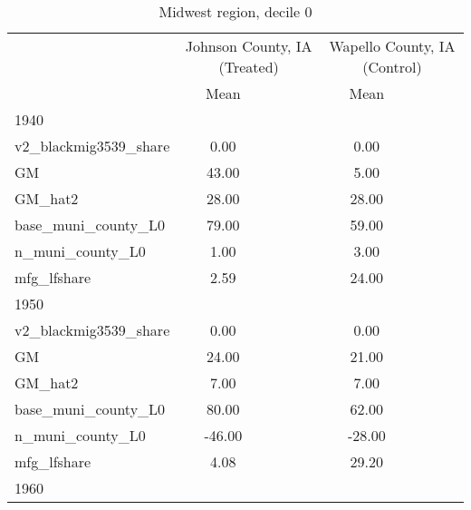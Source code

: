 \begin{table}[htbp]\centering
\def\sym#1{\ifmmode^{#1}\else\(^{#1}\)\fi}
\caption{Midwest region, decile 0 \label{tab1}}
\begin{tabular}{l*{2}{ccc}}
\toprule
                    &\multicolumn{3}{c}{Johnson County, IA (Treated)}&\multicolumn{3}{c}{Wapello County, IA (Control)}\\
                    &        Mean&            &            &        Mean&            &            \\
\midrule
1940                &            &            &            &            &            &            \\
v2\_blackmig3539\_share&        0.00&            &            &        0.00&            &            \\
GM                  &       43.00&            &            &        5.00&            &            \\
GM\_hat2             &       28.00&            &            &       28.00&            &            \\
base\_muni\_county\_L0 &       79.00&            &            &       59.00&            &            \\
n\_muni\_county\_L0    &        1.00&            &            &        3.00&            &            \\
mfg\_lfshare         &        2.59&            &            &       24.00&            &            \\
\midrule
1950                &            &            &            &            &            &            \\
v2\_blackmig3539\_share&        0.00&            &            &        0.00&            &            \\
GM                  &       24.00&            &            &       21.00&            &            \\
GM\_hat2             &        7.00&            &            &        7.00&            &            \\
base\_muni\_county\_L0 &       80.00&            &            &       62.00&            &            \\
n\_muni\_county\_L0    &      -46.00&            &            &      -28.00&            &            \\
mfg\_lfshare         &        4.08&            &            &       29.20&            &            \\
\midrule
1960                &            &            &            &            &            &            \\

\end{tabular}
\end{table}
